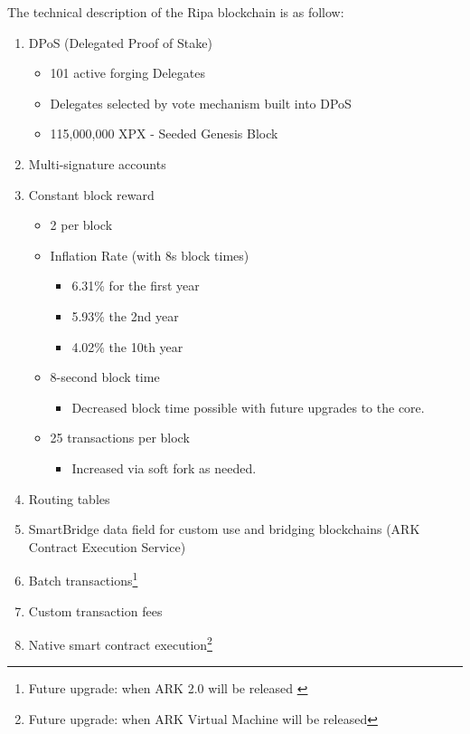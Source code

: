 \documentclass[11pt,fleqn]{book} %
\begin{document}
The technical description of the Ripa blockchain is as follow:
\begin{enumerate}
	\item DPoS (Delegated Proof of Stake)
	\begin{itemize}
		\item 101 active forging Delegates
		\item Delegates selected by vote mechanism built into DPoS
		\item 115,000,000 XPX - Seeded Genesis Block
	\end{itemize}
	\item Multi-signature accounts
	\item Constant block reward
	\begin{itemize}
		\item 2 \PHP per block
		\item Inflation Rate (with 8s block times)
		\begin{itemize}
			\item 6.31\% for the first year
			\item 5.93\% the 2nd year
			\item 4.02\% the 10th year
		\end{itemize}
		\item 8-second block time
		\begin{itemize}
			\item Decreased block time possible with future upgrades to the core.
		\end{itemize}
		\item 25 transactions per block
		\begin{itemize}
			\item Increased via soft fork as needed.
		\end{itemize}
	\end{itemize}
	\item Routing tables
	\item SmartBridge data field for custom use and bridging blockchains (ARK Contract Execution Service)
	\item Batch transactions\footnote{Future upgrade: when ARK 2.0 will be released \label{note1}}
	\item Custom transaction fees\footnotemark[\value{footnote}]
	\item Native smart contract execution\footnote{Future upgrade: when ARK Virtual Machine will be released}
\end{enumerate}
\end{document}
